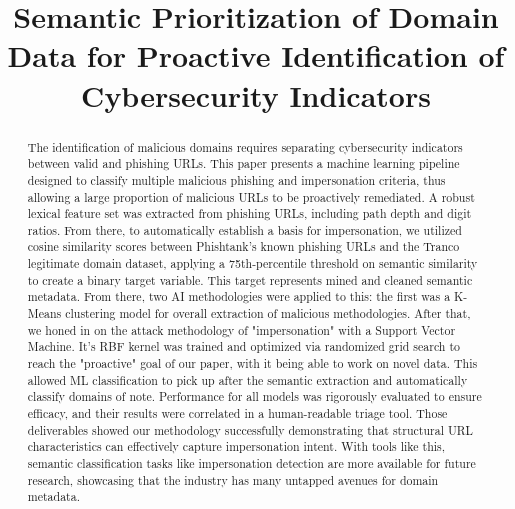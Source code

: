 \documentclass[conference]{IEEEtran}
\begin{document}
\pagestyle{plain}

\title{Semantic Prioritization of Domain Data for Proactive Identification of Cybersecurity Indicators}

\author{
\and
{}
}

\maketitle

\begin{abstract}
The identification of malicious domains requires separating cybersecurity indicators between valid and phishing URLs.
This paper presents a machine learning pipeline designed to classify multiple malicious phishing and impersonation criteria, thus allowing a large proportion of malicious URLs to be proactively remediated.
A robust lexical feature set was extracted from phishing URLs, including path depth and digit ratios.
From there, to automatically establish a basis for impersonation, we utilized cosine similarity scores between Phishtank's known phishing URLs and the Tranco legitimate domain dataset, applying a 75th-percentile threshold on semantic similarity to create a binary target variable.
This target represents mined and cleaned semantic metadata. From there, two AI methodologies were applied to this: the first was a K-Means clustering model for overall extraction of malicious methodologies. 
After that, we honed in on the attack methodology of "impersonation" with a Support Vector Machine. It's RBF kernel was trained and optimized via randomized grid search to reach the "proactive" goal of our paper, with it being able to work on novel data.
This allowed ML classification to pick up after the semantic extraction and automatically classify domains of note. 
Performance for all models was rigorously evaluated to ensure efficacy, and their results were correlated in a human-readable triage tool.
Those deliverables showed our methodology successfully demonstrating that structural URL characteristics can effectively capture impersonation intent. With tools like this, semantic classification tasks like impersonation detection are more available for future research, showcasing that the industry has many untapped avenues for domain metadata.
\end{abstract}
\end{document}
